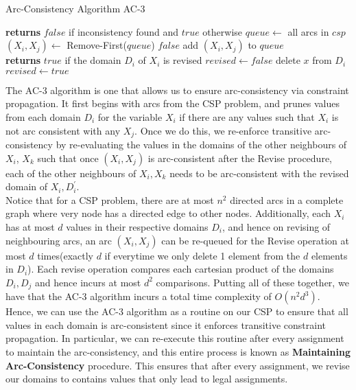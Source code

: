 \documentclass[12pt]{article}
\begin{document}
\begin{algorithm}
\caption{Arc-Consistency Algorithm AC-3}\label{euclid}
\begin{algorithmic}[1]
 \textbf{returns} $false$ if inconsistency found and $true$ otherwise
\State $queue \leftarrow$ all arcs in $csp$
$(X_i, X_j) \leftarrow$ Remove-First($queue$)
 \Return $false$ \EndIf
{}
\State add $(X_i, X_j)$ to $queue$
\EndFor
\EndIf
\EndWhile
\EndProcedure
\\
 \textbf{returns} $true$ if the domain $D_i$ of $X_i$ is revised
\State $revised \leftarrow false$ 
\State delete $x$ from $D_i$
\State $revised \leftarrow true$
\EndIf
\EndFor 
\EndProcedure
\end{algorithmic}
\end{algorithm}

The AC-3 algorithm is one that allows us to ensure arc-consistency via constraint propagation. It first begins with arcs from the CSP problem, and prunes values from each domain $D_i$ for the variable $X_i$ if there are any values such that $X_i$ is not arc consistent with any $X_j$. Once we do this, we re-enforce transitive arc-consistency by re-evaluating the values in the domains of the other neighbours of $X_i$, $X_k$ such that once $(X_i, X_j)$ is arc-consistent after the Revise procedure, each of the other neighbours of $X_i, X_k$ needs to be arc-consistent with the revised domain of $X_i, D_{i}^{'}$.\\

Notice that for a CSP problem, there are at most $n^2$ directed arcs in a complete graph where very node has a directed edge to other nodes. Additionally, each $X_i$ has at most $d$ values in their respective domains $D_i$, and hence on revising of neighbouring arcs, an arc $(X_i, X_j)$ can be re-queued for the Revise operation at most $d$ times(exactly $d$ if everytime we only delete 1 element from the $d$ elements in $D_i$). Each revise operation compares each cartesian product of the domains $D_i, D_j$ and hence incurs at most $d^2$ comparisons. Putting all of these together, we have that the AC-3 algorithm incurs a total time complexity of $O(n^2d^3)$.\\

Hence, we can use the AC-3 algorithm as a routine on our CSP to ensure that all values in each domain is arc-consistent since it enforces transitive constraint propagation. In particular, we can re-execute this routine after every assignment to maintain the arc-consistency, and this entire process is known as \textbf{Maintaining Arc-Consistency} procedure. This ensures that after every assignment, we revise our domains to contains values that only lead to legal assignments.
\end{document}
